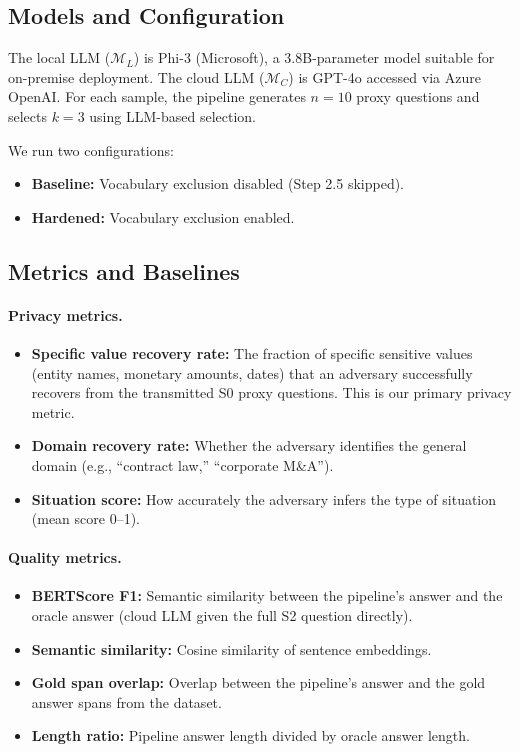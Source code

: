 \documentclass[sigconf,anonymous,review,balance=false]{acmart}
\begin{document}
\subsection{Models and Configuration}
\label{sec:models}

The local LLM ($\mathcal{M}_L$) is Phi-3 (Microsoft), a 3.8B-parameter model suitable for on-premise deployment.
The cloud LLM ($\mathcal{M}_C$) is GPT-4o accessed via Azure OpenAI.
For each sample, the pipeline generates $n = 10$ proxy questions and selects $k = 3$ using LLM-based selection.

We run two configurations:
\begin{itemize}
\item \textbf{Baseline:} Vocabulary exclusion disabled (Step 2.5 skipped).
\item \textbf{Hardened:} Vocabulary exclusion enabled.
\end{itemize}

\subsection{Metrics and Baselines}
\label{sec:metrics}

\paragraph{Privacy metrics.}
\begin{itemize}
\item \textbf{Specific value recovery rate:} The fraction of specific sensitive values (entity names, monetary amounts, dates) that an adversary successfully recovers from the transmitted S0 proxy questions. This is our primary privacy metric.
\item \textbf{Domain recovery rate:} Whether the adversary identifies the general domain (e.g., ``contract law,'' ``corporate M\&A'').
\item \textbf{Situation score:} How accurately the adversary infers the type of situation (mean score 0--1).
\end{itemize}

\paragraph{Quality metrics.}
\begin{itemize}
\item \textbf{BERTScore F1:} Semantic similarity between the pipeline's answer and the oracle answer (cloud LLM given the full S2 question directly).
\item \textbf{Semantic similarity:} Cosine similarity of sentence embeddings.
\item \textbf{Gold span overlap:} Overlap between the pipeline's answer and the gold answer spans from the dataset.
\item \textbf{Length ratio:} Pipeline answer length divided by oracle answer length.
\end{itemize}
\end{document}
